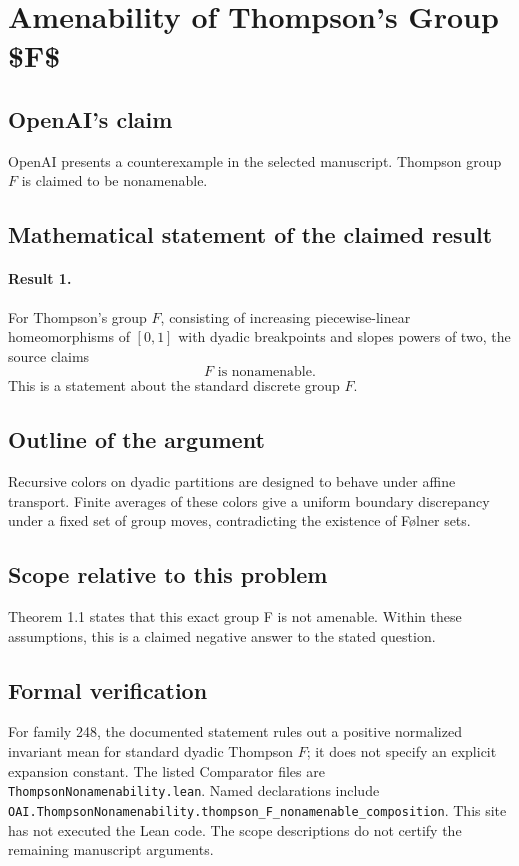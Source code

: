 \documentclass[11pt]{article}
\begin{document}
\section*{Amenability of Thompson's Group \$F\$}

\subsection{OpenAI's claim}
OpenAI presents a counterexample in the selected manuscript. Thompson group $F$ is claimed to be nonamenable.

\subsection{Mathematical statement of the claimed result}
\paragraph{Result 1.} For Thompson's group \(F\), consisting of increasing piecewise-linear homeomorphisms of \([0,1]\) with dyadic breakpoints and slopes powers of two, the source claims
\[
 F\text{ is nonamenable}.
\]
This is a statement about the standard discrete group \(F\).

\subsection{Outline of the argument}
Recursive colors on dyadic partitions are designed to behave under affine transport. Finite averages of these colors give a uniform boundary discrepancy under a fixed set of group moves, contradicting the existence of Følner sets.

\subsection{Scope relative to this problem}
Theorem 1.1 states that this exact group F is not amenable. Within these assumptions, this is a claimed negative answer to the stated question.

\subsection{Formal verification}
For family 248, the documented statement rules out a positive normalized invariant mean for standard dyadic Thompson $F$; it does not specify an explicit expansion constant. The listed Comparator files are \texttt{ThompsonNonamenability.lean}. Named declarations include \texttt{OAI.ThompsonNonamenability.thompson\_F\_nonamenable\_composition}. This site has not executed the Lean code. The scope descriptions do not certify the remaining manuscript arguments.
\end{document}
